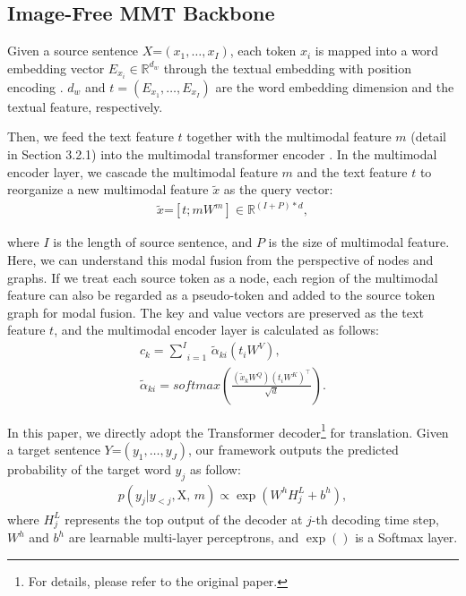\documentclass[11pt]{article}
\begin{document}
\subsection{Image-Free MMT Backbone}
Given a source sentence $X\text{=}\left( {{x}_{1}},\ldots ,{{x}_{I}} \right)$, each token ${x}_{i}$ is mapped into a word embedding vector ${{E}_{{{x}_{i}}}}\in {{\mathbb{R}}^{{{d}_{w}}}}$ through the textual embedding with position encoding \cite{ gehring-2017-convolutional}.
${d_{w}}$ and $t=\left( {{E}_{{{x}_{1}}}},\ldots ,{{E}_{{{x}_{I}}}} \right)$ are the word embedding dimension and the textual feature, respectively.

Then, we feed the text feature $t$ together with the multimodal feature $m$ (detail in Section 3.2.1) into the multimodal transformer encoder \cite{yao-wan-2020-multimodal}.
In the multimodal encoder layer, we cascade the multimodal feature $m$ and the text feature $t$ to reorganize a new multimodal feature $\widetilde{x}$ as the query vector:
\begin{gather}
\widetilde{x}\text{=}\left[ t;m{{W}^{m}} \right]\in {{\mathbb{R}}^{(I+P)*d}}\label{eq:1},
\end{gather}

where $I$ is the length of source sentence, and $P$ is the size of multimodal feature. Here, we can understand this modal fusion from the perspective of nodes and graphs.
If we treat each source token as a node, each region of the multimodal feature can also be regarded as a pseudo-token and added to the source token graph for modal fusion.
The key and value vectors are preserved as the text feature $t$, and the multimodal encoder layer is calculated as follows:
\begin{gather}
{{c}_{k}}=\underset{i=1}{\overset{I}{\mathop{\sum }}}\,{{\tilde{\alpha }}_{ki}}\left( {{t}_{i}}{{W}^{V}} \right),\label{eq:2}\\
{{\tilde{\alpha }}_{ki}}=softmax\left( \frac{\left( {{{\tilde{x}}}_{k}}{{W}^{Q}} \right){{\left( {{t}_{i}}{{W}^{K}} \right)}^{\top }}}{\sqrt{d}} \right).\label{eq:3}
\end{gather}

In this paper, we directly adopt the Transformer decoder\footnote{For details, please refer to the original paper.} \cite{vaswani2017attention} for translation.
Given a target sentence $Y\text{=}\left( {{y}_{1}},\ldots ,{{y}_{J}} \right)$, our framework outputs the predicted probability of the target word ${{y}_{j}}$ as follow:
\begin{gather}
p\left( {{y}_{j}}| {{y}_{<j}},\text{X, }m \right)\propto \exp \left( {{W}^{h}}H_{j}^{L}+{{b}^{h}} \right),\label{eq:4}
\end{gather}
where $H_{j}^{L}$ represents the top output of the decoder at $j$-th decoding time step, ${{W}^{h}}$ and ${{b}^{h}}$ are learnable multi-layer perceptrons, and $\exp () $ is a Softmax layer.
\end{document}
